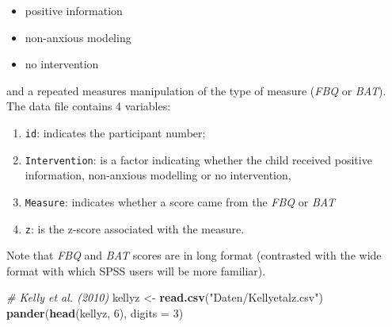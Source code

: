 \documentclass[
]{article}
\newenvironment{Shaded}{\begin{snugshade}}{\end{snugshade}}
\newcommand{\AttributeTok}[1]{\textcolor[rgb]{0.13,0.29,0.53}{#1}}
\newcommand{\CommentTok}[1]{\textcolor[rgb]{0.56,0.35,0.01}{\textit{#1}}}
\newcommand{\DecValTok}[1]{\textcolor[rgb]{0.00,0.00,0.81}{#1}}
\newcommand{\FunctionTok}[1]{\textcolor[rgb]{0.13,0.29,0.53}{\textbf{#1}}}
\newcommand{\NormalTok}[1]{#1}
\newcommand{\OtherTok}[1]{\textcolor[rgb]{0.56,0.35,0.01}{#1}}
\newcommand{\StringTok}[1]{\textcolor[rgb]{0.31,0.60,0.02}{#1}}
\providecommand{\tightlist}{%
  \setlength{\itemsep}{0pt}\setlength{\parskip}{0pt}}
\begin{document}
\begin{itemize}
\tightlist
\item
  positive information
\item
  non-anxious modeling
\item
  no intervention
\end{itemize}

and a repeated measures manipulation of the type of measure (\emph{FBQ} or \emph{BAT}). The data file contains 4 variables:

\begin{enumerate}
\def\labelenumi{\arabic{enumi}.}
\tightlist
\item
  \texttt{id}: indicates the participant number;
\item
  \texttt{Intervention}: is a factor indicating whether the child received positive information, non-anxious modelling or no intervention,
\item
  \texttt{Measure}: indicates whether a score came from the \emph{FBQ} or \emph{BAT}
\item
  \texttt{z}: is the z-score associated with the measure.
\end{enumerate}

Note that \emph{FBQ} and \emph{BAT} scores are in long format (contrasted with the wide format with which SPSS users will be more familiar).

\begin{Shaded}
\begin{Highlighting}[]
    \CommentTok{\# Kelly et al. (2010)}
\NormalTok{    kellyz }\OtherTok{\textless{}{-}} \FunctionTok{read.csv}\NormalTok{(}\StringTok{"Daten/Kellyetalz.csv"}\NormalTok{)}
    \FunctionTok{pander}\NormalTok{(}\FunctionTok{head}\NormalTok{(kellyz, }\DecValTok{6}\NormalTok{), }\AttributeTok{digits =} \DecValTok{3}\NormalTok{)}
\end{Highlighting}
\end{Shaded}
\end{document}
